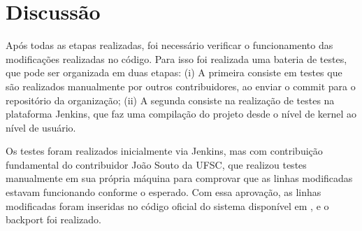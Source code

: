 \section{Discussão}

Após todas as etapas realizadas, foi necessário verificar o funcionamento das modificações realizadas no código. Para isso foi realizada uma bateria de testes, que 
pode ser organizada em duas etapas: (i) A primeira consiste em testes que são realizados manualmente por outros contribuidores, ao enviar o commit para o repositório 
da organização; (ii) A segunda consiste na realização de testes na plataforma Jenkins, que faz uma compilação do projeto desde o nível de kernel ao nível de usuário. 

Os testes foram realizados inicialmente via Jenkins, mas com contribuição fundamental do contribuidor João Souto da UFSC, que realizou testes manualmente em sua própria máquina para comprovar que as linhas modificadas estavam funcionando conforme o esperado. Com essa aprovação, as linhas modificadas foram inseridas no código oficial do sistema disponível em \cite{SolucaoInstrucoesDOWNGrade}, e o backport foi realizado. 
